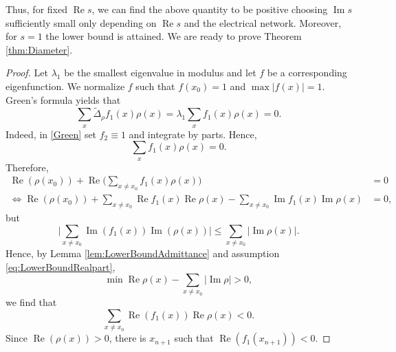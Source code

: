\documentclass[a4paper,11pt]{amsart}
\theoremstyle{definition}
\renewcommand{\Re}{\operatorname{Re}}%
\renewcommand{\Im}{\operatorname{Im}}%
\begin{document}
Thus, for fixed $\Re s$, we can find the above quantity to be positive choosing $\Im s$ sufficiently small only depending on $\Re s$ and the electrical network. Moreover, for $s=1$ the lower bound is attained. We are ready to prove Theorem \ref{thm:Diameter}.

\begin{proof}
Let $\lambda_1$ be the smallest eigenvalue in modulus and let $f$ be a corresponding eigenfunction. We normalize $f$ such that $f(x_0) = 1$ and $\max |f(x)| = 1$. Green's formula yields that
\begin{equation*}
\sum_x \widetilde \Delta_\rho f_1(x) \rho(x) = \lambda_1 \sum_x f_1(x) \rho(x) = 0.
\end{equation*}
Indeed, in \eqref{Green} set $f_2 \equiv 1$ and integrate by parts.
Hence,
\begin{equation*}
\sum_x f_1(x) \rho(x) = 0.
\end{equation*}
Therefore,
\begin{align*}
\Re (\rho(x_0)) + \Re \big( \sum_{x \neq x_0} f_1(x) \rho(x) \big) &= 0 \\
\Leftrightarrow \Re (\rho(x_0)) + \sum_{x \neq x_0} \Re f_1(x) \Re \rho(x) - \sum_{x \neq x_0} \Im f_1(x) \Im \rho(x) &= 0,
\end{align*}
but
\begin{equation*}
\big| \sum_{x \neq x_0} \Im (f_1(x)) \Im (\rho(x)) \big| \leq \sum_{x \neq x_0} |\Im \rho(x)|.
\end{equation*}
Hence, by Lemma \ref{lem:LowerBoundAdmittance} and assumption \eqref{eq:LowerBoundRealpart},
\begin{equation*}
\min \Re \rho(x) - \sum_{x \neq x_0} |\Im \rho| > 0,
\end{equation*}
we find that
\begin{equation*}
\sum_{x \neq x_0} \Re (f_1(x)) \Re \rho(x) < 0 .
\end{equation*}
Since $\Re (\rho(x)) > 0$, there is $x_{n+1}$ such that $\Re (f_1(x_{n+1}))<0$.


\end{proof}
\end{document}
